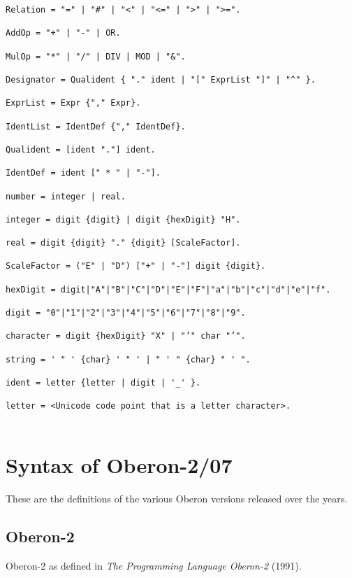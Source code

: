 \documentclass[12pt]{article}
\begin{document}
{\begin{lstlisting}[style=EBNF]
Relation = "=" | "#" | "<" | "<=" | ">" | ">=".

AddOp = "+" | "-" | OR.

MulOp = "*" | "/" | DIV | MOD | "&".

Designator = Qualident { "." ident | "[" ExprList "]" | "^" }. 

ExprList = Expr {"," Expr}.

IdentList = IdentDef {"," IdentDef}.

Qualident = [ident "."] ident.

IdentDef = ident [" * " | "-"].

number = integer | real.

integer = digit {digit} | digit {hexDigit} "H".

real = digit {digit} "." {digit} [ScaleFactor]. 

ScaleFactor = ("E" | "D") ["+" | "-"] digit {digit}.

hexDigit = digit|"A"|"B"|"C"|"D"|"E"|"F"|"a"|"b"|"c"|"d"|"e"|"f".

digit = "0"|"1"|"2"|"3"|"4"|"5"|"6"|"7"|"8"|"9".

character = digit {hexDigit} "X" | "’" char "’".

string = ' " ' {char} ' " ' | " ' " {char} " ' ".

ident = letter {letter | digit | '_' }.

letter = <Unicode code point that is a letter character>.
 
\end{lstlisting}}

\section{Syntax of Oberon-2/07}

These are the definitions of the various Oberon versions released over the years.

\subsection{Oberon-2}

Oberon-2 as defined in {\em The Programming Language Oberon-2} (1991).
\end{document}
